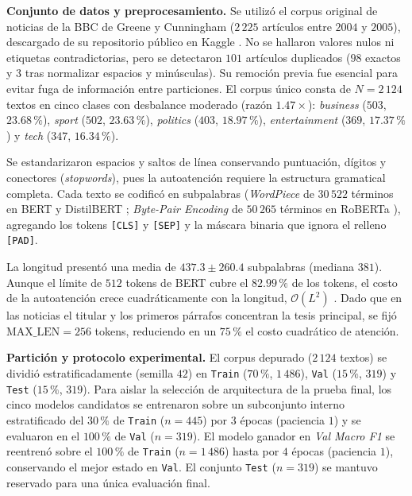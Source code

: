\documentclass[letterpaper, 10 pt, conference]{ieeeconf}
\makeatletter
\def\section{\@startsection{section}{1}{\z@}{0.60ex plus 0.15ex minus 0.1ex}{0.15ex plus 0.05ex minus 0ex}{\normalfont\normalsize\centering\scshape}}
\makeatother
\begin{document}
\section{Metodología}

\textbf{Conjunto de datos y preprocesamiento.}
Se utilizó el corpus original de noticias de la BBC de Greene y Cunningham \cite{c1} ($2\,225$ artículos entre $2004$ y $2005$), descargado de su repositorio público en Kaggle \cite{c6}. No se hallaron valores nulos ni etiquetas contradictorias, pero se detectaron $101$ artículos duplicados ($98$ exactos y $3$ tras normalizar espacios y minúsculas). Su remoción previa fue esencial para evitar fuga de información entre particiones. El corpus único consta de $N = 2\,124$ textos en cinco clases con desbalance moderado (razón $1.47\times$): \textit{business} ($503$, $23.68\,\%$), \textit{sport} ($502$, $23.63\,\%$), \textit{politics} ($403$, $18.97\,\%$), \textit{entertainment} ($369$, $17.37\,\%$) y \textit{tech} ($347$, $16.34\,\%$).

Se estandarizaron espacios y saltos de línea conservando puntuación, dígitos y conectores (\textit{stopwords}), pues la autoatención requiere la estructura gramatical completa. Cada texto se codificó en subpalabras (\textit{WordPiece} de $30\,522$ términos en BERT y DistilBERT \cite{c3, c5}; \textit{Byte-Pair Encoding} de $50\,265$ términos en RoBERTa \cite{c4}), agregando los tokens \texttt{[CLS]} y \texttt{[SEP]} y la máscara binaria que ignora el relleno \texttt{[PAD]}.

La longitud presentó una media de $437.3 \pm 260.4$ subpalabras (mediana $381$). Aunque el límite de $512$ tokens de BERT cubre el $82.99\,\%$ de los tokens, el costo de la autoatención crece cuadráticamente con la longitud, $\mathcal{O}(L^2)$ \cite{c2}. Dado que en las noticias el titular y los primeros párrafos concentran la tesis principal, se fijó $\text{MAX\_LEN} = 256$ tokens, reduciendo en un $75\,\%$ el costo cuadrático de atención.

\textbf{Partición y protocolo experimental.}
El corpus depurado ($2\,124$ textos) se dividió estratificadamente (semilla $42$) en \texttt{Train} ($70\,\%$, $1\,486$), \texttt{Val} ($15\,\%$, $319$) y \texttt{Test} ($15\,\%$, $319$). Para aislar la selección de arquitectura de la prueba final, los cinco modelos candidatos se entrenaron sobre un subconjunto interno estratificado del $30\,\%$ de \texttt{Train} ($n = 445$) por $3$ épocas (paciencia $1$) y se evaluaron en el $100\,\%$ de \texttt{Val} ($n = 319$). El modelo ganador en \textit{Val Macro F1} se reentrenó sobre el $100\,\%$ de \texttt{Train} ($n = 1\,486$) hasta por $4$ épocas (paciencia $1$), conservando el mejor estado en \texttt{Val}. El conjunto \texttt{Test} ($n = 319$) se mantuvo reservado para una única evaluación final.
\end{document}
